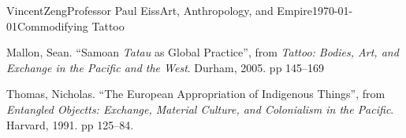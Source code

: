 \documentclass[12pt]{article}
\begin{document}
\begin{mla}{Vincent}{Zeng}{Professor Paul Eiss}{Art, Anthropology, and
  Empire}{\today}{Commodifying Tattoo}

  
\begin{workscited}
  \bibent 
  Mallon, Sean. ``Samoan \textit{Tatau} as Global Practice'', from
  \textit{Tattoo: Bodies, Art, and Exchange in the Pacific and the West}.
  Durham, 2005. pp 145--169

  \bibent
  Thomas, Nicholas. ``The European Appropriation of Indigenous Things'', from
  \textit{Entangled Objectts: Exchange, Material Culture, and Colonialism in the
  Pacific}. Harvard, 1991. pp 125--84.

\end{workscited}
\end{mla}
\end{document}
